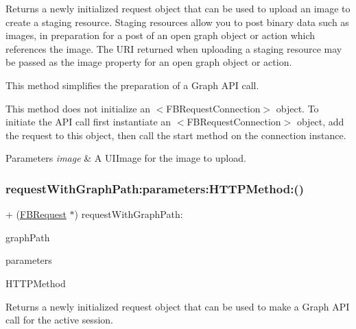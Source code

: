 Returns a newly initialized request object that can be used to upload an image to create a staging resource. Staging resources allow you to post binary data such as images, in preparation for a post of an open graph object or action which references the image. The U\+RI returned when uploading a staging resource may be passed as the image property for an open graph object or action.

This method simplifies the preparation of a Graph A\+PI call.

This method does not initialize an $<$\+F\+B\+Request\+Connection$>$ object. To initiate the A\+PI call first instantiate an $<$\+F\+B\+Request\+Connection$>$ object, add the request to this object, then call the {\ttfamily start} method on the connection instance.


\begin{DoxyParams}{Parameters}
{\em image} & A {\ttfamily U\+I\+Image} for the image to upload. \\
\hline
\end{DoxyParams}
\mbox{\label{interfaceFBRequest_a2e3ee15f72f7e3380495fcf1660154ce}} 
\subsubsection{\texorpdfstring{request\+With\+Graph\+Path\+:parameters\+:\+H\+T\+T\+P\+Method\+:()}{requestWithGraphPath:parameters:HTTPMethod:()}\hspace{0.1cm}{\footnotesize\ttfamily [1/5]}}
{\footnotesize\ttfamily + (\hyperlink{interfaceFBRequest}{F\+B\+Request} $\ast$) request\+With\+Graph\+Path\+: \begin{DoxyParamCaption}\item[{(N\+S\+String $\ast$)}]{graph\+Path }\item[{parameters:(N\+S\+Dictionary $\ast$)}]{parameters }\item[{HTTPMethod:(N\+S\+String $\ast$)}]{H\+T\+T\+P\+Method }\end{DoxyParamCaption}}

Returns a newly initialized request object that can be used to make a Graph A\+PI call for the active session.


